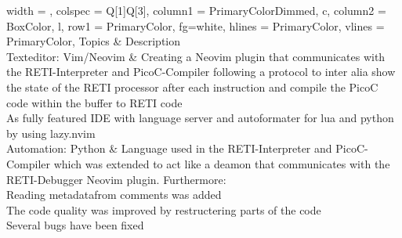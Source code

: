 \documentclass{report}
\begin{document}
\begin{table}[H]
	\centering
	\begin{tblr}{
		width = \linewidth,
		colspec = {Q[1]Q[3]},
		column{1} = {PrimaryColorDimmed, c},
		column{2} = {BoxColor, l},
		row{1} = {PrimaryColor, fg=white},
		hlines = {PrimaryColor},
		vlines = {PrimaryColor},
		}
		Topics                 & Description                                                                                                                                                                                                                                                                                          \\
		Texteditor: Vim/Neovim & {\hspace{\dimexpr\labelsep+0.5\tabcolsep}Creating a Neovim plugin that communicates with the RETI-Interpreter and PicoC-Compiler following a protocol to inter alia show the state of the RETI processor after each instruction and compile the PicoC code within the buffer to RETI code \\\hspace{\dimexpr\labelsep+0.5\tabcolsep}As fully featured IDE with language server and autoformater for lua and python by using lazy.nvim} \\
		Automation: Python     & {\hspace{\dimexpr\labelsep+0.5\tabcolsep}Language used in the RETI-Interpreter and PicoC-Compiler which was extended to act like a deamon that communicates with the RETI-Debugger Neovim plugin. Furthermore:                                                                            \\\hspace*{0.5\leftmargin}\hspace{\dimexpr\labelsep+0.5\tabcolsep}Reading metadatafrom comments was added\\\hspace*{0.5\leftmargin}\hspace{\dimexpr\labelsep+0.5\tabcolsep}The code quality was improved by restructering parts of the code\\\hspace*{0.5\leftmargin}\hspace{\dimexpr\labelsep+0.5\tabcolsep}Several bugs have been fixed}                                                                                                                                                                                                                \\

\end{tblr}
\end{table}
\end{document}
